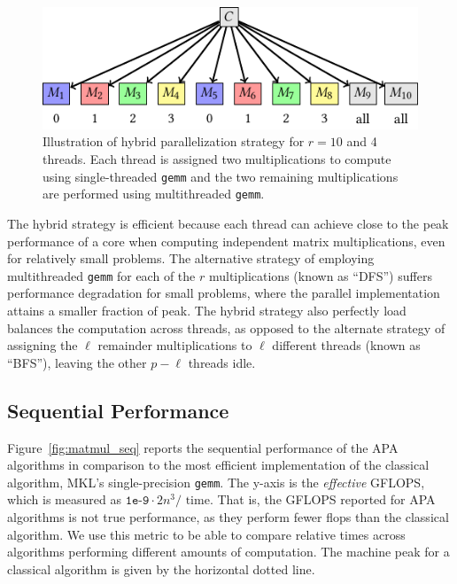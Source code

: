 \documentclass[manuscript]{acmart}
\newcommand{\num}[1]{\texttt{#1}}
\begin{document}
\begin{figure}
\centering
%
\includegraphics{tikz-taps/paper-figure1.pdf}
\caption{Illustration of hybrid parallelization strategy for $r=10$ and 4 threads.  Each thread is assigned two multiplications to compute using single-threaded \texttt{gemm} and the two remaining multiplications are performed using multithreaded \texttt{gemm}.}
\label{fig:hybrid}
\end{figure}

The hybrid strategy is efficient because each thread can achieve close to the peak performance of a core when computing independent matrix multiplications, even for relatively small problems.
The alternative strategy of employing multithreaded \texttt{gemm} for each of the $r$ multiplications (known as ``DFS'') suffers performance degradation for small problems, where the parallel implementation attains a smaller fraction of peak.
The hybrid strategy also perfectly load balances the computation across threads, as opposed to the alternate strategy of assigning the $\ell$ remainder multiplications to $\ell$ different threads (known as ``BFS''), leaving the other $p-\ell$ threads idle.

\subsection{Sequential Performance}

Figure~\ref{fig:matmul_seq} reports the sequential performance of the APA algorithms in comparison to the most efficient implementation of the classical algorithm, MKL's single-precision \texttt{gemm}.
The y-axis is the \emph{effective} GFLOPS, which is measured as $\num{1e-9} \cdot 2n^3 / \text{ time}$.
That is, the GFLOPS reported for APA algorithms is not true performance, as they perform fewer flops than the classical algorithm.
We use this metric to be able to compare relative times across algorithms performing different amounts of computation.
The machine peak for a classical algorithm is given by the horizontal dotted line.
\end{document}

